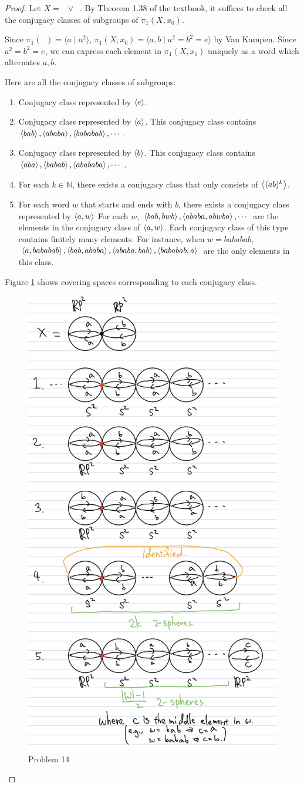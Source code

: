 \documentclass[12pt, psamsfonts]{amsart}
\theoremstyle{definition}
\theoremstyle{remark}
\DeclareMathOperator{\RP}{\mathbb{R}\mathbf{P}^2}
\numberwithin{equation}{section}
\begin{document}
\begin{proof}
  Let $X = \RP \vee \RP$.
  By Theorem 1.38 of the textbook, it suffices to check all the conjugacy classes of subgroups of $\pi_1(X, x_0)$.

  Since $\pi_1(\RP) = \langle a \mid a^2 \rangle$, $\pi_1(X, x_0) = \langle a, b \mid a^2 = b^2 = e \rangle$ by Van Kampen.
  Since $a^2 = b^2 = e$, we can express each element in $\pi_1(X, x_0)$ uniquely as a word which alternates $a, b$.

  Here are all the conjugacy classes of subgroups:
  \begin{enumerate}
    \item
      Conjugacy class represented by $\ev{e}$.
    \item
      Conjugacy class represented by $\ev{a}$.
      This conjugacy class contains $\ev{bab}, \ev{ababa}, \ev{bababab}, \cdots$.
    \item
      Conjugacy class represented by $\ev{b}$.
      This conjugacy class contains $\ev{aba}, \ev{babab}, \ev{abababa}, \cdots$.
    \item
      For each $k \in \mathbb{N}$, there exists a conjugacy class that only consists of $\ev{(ab)^k}$.
    \item
      For each word $w$ that starts and ends with $b$, there exists a conjugacy class represented by $\ev{a, w}$ 
      For each $w$, $\ev{bab, bwb}, \ev{ababa, abwba}, \cdots$ are the elements in the conjugacy class of $\ev{a, w}$.
      Each conjugacy class of this type contains finitely many elements.
      For instance, when $w = bababab$, $\ev{a, bababab}, \ev{bab, ababa}, \ev{ababa, bab}, \ev{bababab, a}$ are the only elements in this class.
  \end{enumerate}

  Figure \ref{fig:problem14} shows covering spaces corresponding to each conjugacy class.
  \begin{figure}
    \includegraphics[width=.5\linewidth]{problem14_rp2.jpeg}
    \caption{Problem 14}
    \label{fig:problem14}
  \end{figure}


\end{proof}
\end{document}
